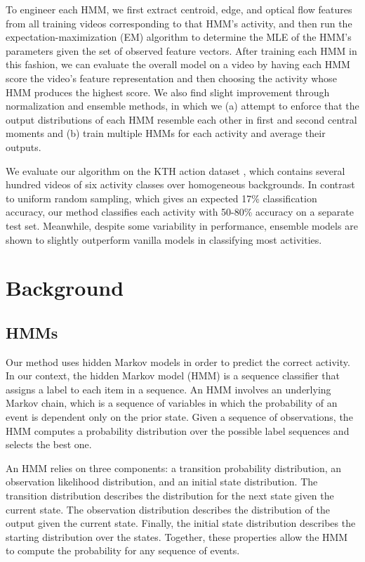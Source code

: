 \documentclass{article}
\begin{document}
To engineer each HMM, we first extract centroid, edge, and optical flow features from all training videos corresponding to that HMM's activity, and then run the expectation-maximization (EM) algorithm to determine the MLE of the HMM's parameters given the set of observed feature vectors. After training each HMM in this fashion, we can evaluate the overall model on a video by having each HMM score the video's feature representation and then choosing the activity whose HMM produces the highest score. We also find slight improvement through normalization and ensemble methods, in which we (a) attempt to enforce that the output distributions of each HMM resemble each other in first and second central moments and (b) train multiple HMMs for each activity and average their outputs.

We evaluate our algorithm on the KTH action dataset \cite{slc2004}, which contains several hundred videos of six activity classes over homogeneous backgrounds. In contrast to uniform random sampling, which gives an expected 17\% classification accuracy, our method classifies each activity with 50-80\% accuracy on a separate test set. Meanwhile, despite some variability in performance, ensemble models are shown to slightly outperform vanilla models in classifying most activities.

\section{Background}

\subsection{HMMs}\label{sec:hmms}

Our method uses hidden Markov models in order to predict the correct activity. In our context, the hidden Markov model (HMM) is a sequence classifier that assigns a label to each item in a sequence. An HMM involves an underlying Markov chain, which is a sequence of variables in which the probability of an event is dependent only on the prior state. Given a sequence of observations, the HMM computes a probability distribution over the possible label sequences and selects the best one. 

An HMM relies on three components: a transition probability distribution, an observation likelihood distribution, and an initial state distribution. The transition distribution describes the distribution for the next state given the current state. The observation distribution describes the distribution of the output given the current state. Finally, the initial state distribution describes the starting distribution over the states. Together, these properties allow the HMM to compute the probability for any sequence of events.
\end{document}
